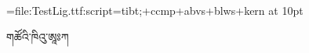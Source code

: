 

\font\testa=file:TestLig.ttf:script=tibt;+ccmp+abvs+blws+kern at 10pt

\testa གཚོའི་ཁིའུ་ཨཱཿཀ


\bye
